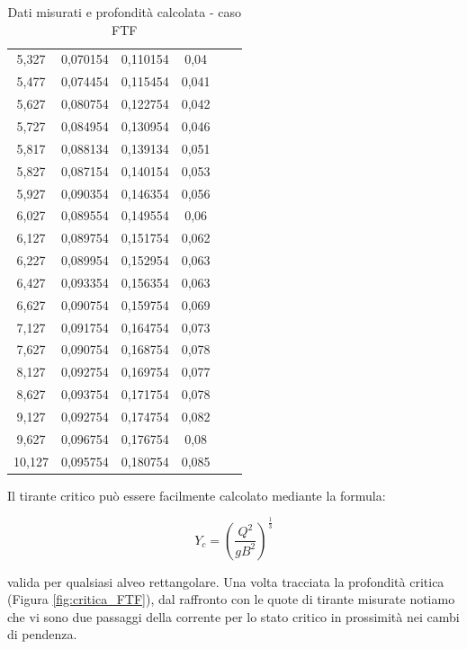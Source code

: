\documentclass[12pt]{article} %
\begin{document}
\begin{table}[H]
\begin{tabular}{cccccc}
5,327  & 0,070154 & 0,110154 & 0,04  &  &  \\
5,477  & 0,074454 & 0,115454 & 0,041 &  &  \\
5,627  & 0,080754 & 0,122754 & 0,042 &  &  \\
5,727  & 0,084954 & 0,130954 & 0,046 &  &  \\
5,817  & 0,088134 & 0,139134 & 0,051 &  &  \\
5,827  & 0,087154 & 0,140154 & 0,053 &  &  \\
5,927  & 0,090354 & 0,146354 & 0,056 &  &  \\
6,027  & 0,089554 & 0,149554 & 0,06  &  &  \\
6,127  & 0,089754 & 0,151754 & 0,062 &  &  \\
6,227  & 0,089954 & 0,152954 & 0,063 &  &  \\
6,427  & 0,093354 & 0,156354 & 0,063 &  &  \\
6,627  & 0,090754 & 0,159754 & 0,069 &  &  \\
7,127  & 0,091754 & 0,164754 & 0,073 &  &  \\
7,627  & 0,090754 & 0,168754 & 0,078 &  &  \\
8,127  & 0,092754 & 0,169754 & 0,077 &  &  \\
8,627  & 0,093754 & 0,171754 & 0,078 &  &  \\
9,127  & 0,092754 & 0,174754 & 0,082 &  &  \\
9,627  & 0,096754 & 0,176754 & 0,08  &  &  \\
10,127 & 0,095754 & 0,180754 & 0,085 &  & 
\\\hline
\end{tabular}
\caption{Dati misurati e profondità calcolata - caso FTF}
\label{tab:FTF}
\end{table}
\vspace*{\fill}
\newpage

\noindent Il tirante critico può essere facilmente calcolato mediante la formula:

\begin{equation}
    Y_c=\left(\frac{Q^2}{gB^2}\right)^\frac{1}{3}
    \label{eqn:Yc}
\end{equation}

\noindent valida per qualsiasi alveo rettangolare. Una volta tracciata la profondità critica (Figura \ref{fig:critica_FTF}), dal raffronto con le quote di tirante misurate notiamo che vi sono due passaggi della corrente per lo stato critico in prossimità nei cambi di pendenza.
\end{document}
